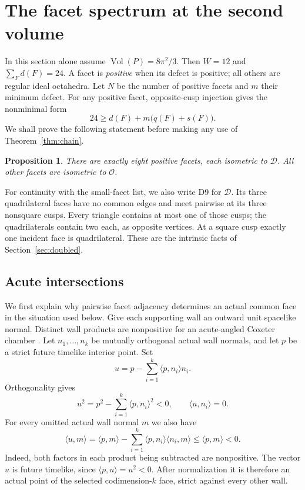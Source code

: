 \documentclass[11pt]{article}
\newtheorem{proposition}[theorem]{Proposition}
\theoremstyle{remark}
\newcommand{\Vol}{\operatorname{Vol}}
\newcommand{\ip}[2]{\langle #1,#2\rangle}
\newcommand{\OCT}{\mathcal O}
\newcommand{\DBL}{\mathcal D}
\begin{document}
\section{The facet spectrum at the second volume}\label{sec:equalityspectrum}
In this section alone assume $\Vol(P)=8\pi^2/3$. Then $W=12$ and
$\sum_Fd(F)=24$. A facet is \emph{positive} when its defect is
positive; all others are regular ideal octahedra. Let $N$ be the
number of positive facets and $m$ their minimum defect. For any
positive facet, opposite-cusp injection gives the nonminimal form
\begin{equation}\label{eq:equalitybudget}
 24\ge d(F)+m\bigl(q(F)+s(F)\bigr).
\end{equation}
We shall prove the following statement before making any use of
Theorem~\ref{thm:chain}.
\begin{proposition}\label{prop:equalityspectrum}
There are exactly eight positive facets, each isometric to $\DBL$.
All other facets are isometric to $\OCT$.
\end{proposition}
For continuity with the small-facet list, we also write D9 for
$\DBL$. Its three quadrilateral faces have no common edges and
meet pairwise at its three nonsquare cusps. Every triangle contains
at most one of those cusps; the quadrilaterals contain two each,
as opposite vertices. At a square cusp exactly one incident face
is quadrilateral. These are the intrinsic facts of
Section~\ref{sec:doubled}.

\subsection{Acute intersections}

We first explain why pairwise facet adjacency determines an actual
common face in the situation used below. Give each supporting wall
an outward unit spacelike normal. Distinct wall products are
nonpositive for an acute-angled Coxeter chamber
\cite[p.~42, \S2.1]{Vinberg}. Let $n_1,\dots,n_k$ be mutually
orthogonal actual wall normals, and let $p$ be a strict future
timelike interior point. Set
\[
 u=p-\sum_{i=1}^k\ip{p}{n_i}n_i.
\]
Orthogonality gives
\[
 u^2=p^2-\sum_{i=1}^k\ip{p}{n_i}^2<0,
 \qquad \ip{u}{n_i}=0.
\]
For every omitted actual wall normal $m$ we also have
\[
 \ip{u}{m}
 =\ip{p}{m}-\sum_{i=1}^k\ip{p}{n_i}\ip{n_i}{m}
 \le\ip{p}{m}<0.
\]
Indeed, both factors in each product being subtracted are
nonpositive. The vector $u$ is future timelike, since
$\ip{p}{u}=u^2<0$. After normalization it is therefore an actual
point of the selected codimension-$k$ face, strict against every
other wall.
\end{document}
